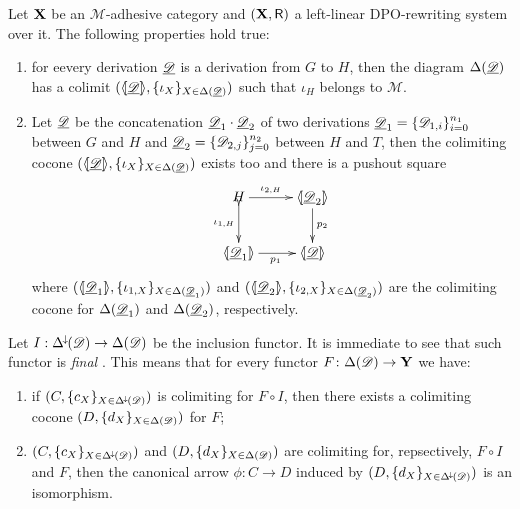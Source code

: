\begin{lemma}\label{lem:colim}
	Let $\textbf {\textup{X}}$ be an $\mathcal{M}$-adhesive category and $(\textbf {\textup{X}}, \mathsf{R})$ a left-linear DPO-rewriting system over it. The following properties hold true:
	\begin{enumerate}
		\item  for eevery derivation $\underline{\mathscr{D}}$ is a derivation from $G$ to $H$, then the diagram $\Delta(\underline{\mathscr{D}})$ has a colimit $(\langle \hspace{-1.85pt}[ \underline{\mathscr{D}}]\hspace{-1.85pt}\rangle, \{\iota_X\}_{X\in \Delta(\underline{\mathscr{D}})})$ such that $\iota_H$ belongs to $\mathcal{M}$.
		\item Let $\underline{\mathscr{D}}$ be the concatenation $\underline{\mathscr{D}}_1\cdot \underline{\mathscr{D}}_2$ of two derivations $\underline{\mathscr{D}}_1=\{\mathscr{D}_{1,i}\}_{i=0}^{n_1}$ between $G$ and $H$ and $\underline{\mathscr{D}}_2=\{\mathscr{D}_{2,j}\}_{j=0}^{n_2}$ between $H$ and $T$,  then the colimiting cocone $(\langle \hspace{-1.85pt}[ \underline{\mathscr{D}}]\hspace{-1.85pt}\rangle, \{\iota_X\}_{X\in \Delta(\underline{\mathscr{D}})})$ exists too and there is a pushout square
		\[\xymatrix{H\ar[r]^-{\iota_{2, H}} \ar@{>->}[d]_-{\iota_{1, H}} & \tproi{D}{2} \ar[d]^{p_2}\\  \tproi{D}{1} \ar[r]_{p_1}& \tpro{D}}\]
		where $(\langle \hspace{-1.85pt}[ \underline{\mathscr{D}}_{1}]\hspace{-1.85pt}\rangle, \{\iota_{1, X}\}_{X\in \Delta(\underline{\mathscr{D}}_1)})$ and $(\langle \hspace{-1.85pt}[ \underline{\mathscr{D}}_{2}]\hspace{-1.85pt}\rangle, \{\iota_{2, X}\}_{X\in \Delta(\underline{\mathscr{D}}_2)})$ are the colimiting cocone for $\Delta(\underline{\mathscr{D}}_1)$ and $\Delta(\underline{\mathscr{D}}_2)$, respectively.
	\end{enumerate}
\end{lemma}
\begin{remark}\label{rem:cof}
Let $I:\Delta^{\hspace{-1pt}\downarrow\hspace{-1pt}}(\mathscr{D})\to \Delta(\mathscr{D})$ be the inclusion functor. It is immediate to see that such functor is \emph{final} \cite{mac2013categories}. This means that for every functor $F\colon \Delta(\mathscr{D})\to \textbf {\textup{Y}}$ we have:
\begin{enumerate}
	\item if  $(C, \{c_X\}_{X\in \Delta^{\hspace{-1pt}\downarrow\hspace{-1pt}}(\mathscr{D})})$ is colimiting for $F\circ I$, then there exists a colimiting cocone $(D, \{d_X\}_{X\in \Delta(\mathscr{D})})$ for $F$;
	\item $(C, \{c_X\}_{X\in \Delta^{\hspace{-1pt}\downarrow\hspace{-1pt}}(\mathscr{D})})$ and $(D, \{d_X\}_{X\in \Delta(\mathscr{D})})$ are colimiting for, repsectively, $F\circ I$ and $F$, then the canonical arrow $\phi\colon C\to D$ induced by $(D, \{d_X\}_{X\in \Delta^{\hspace{-1pt}\downarrow\hspace{-1pt}}(\mathscr{D})})$ is an isomorphism.
\end{enumerate}
\end{remark}


